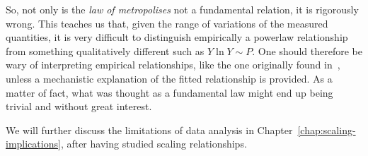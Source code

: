 So, not only is the \emph{law of metropolises} not a fundamental relation, it is
rigorously wrong. 
This teaches us that, given the range of variations of the measured
quantities, it is very difficult to distinguish empirically a powerlaw
relationship from something qualitatively different such as $Y \ln Y \sim P$.
One should therefore be wary of interpreting empirical relationships,
like the one originally found in~\cite{Pumain:1997}, unless a mechanistic
explanation of the fitted relationship is provided. As a matter of fact, what
was thought as a fundamental law might end up being trivial and without great
interest.

We will further discuss the limitations of data analysis in
Chapter~\ref{chap:scaling-implications}, after having studied scaling relationships.



